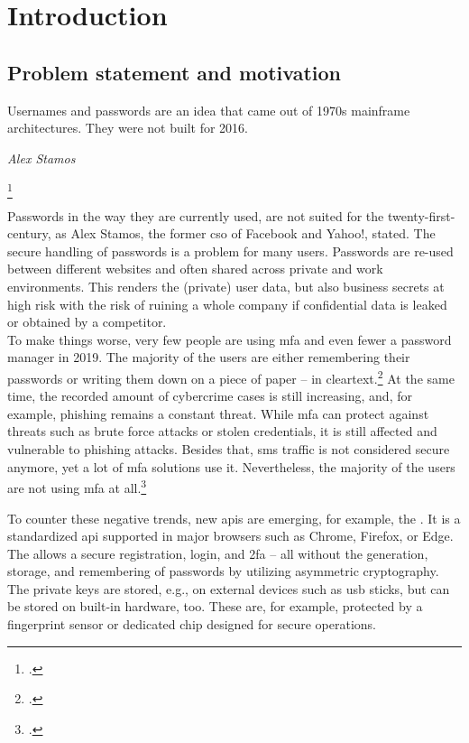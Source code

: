 \chapter{Introduction}
\label{chapter:introduction}

\section{Problem statement and motivation}

\setlength{}
\epigraph{\frqq Usernames and passwords are an idea that came out of 1970s mainframe architectures. They were not built for 2016.\flqq\footnotemark}{\textit{Alex Stamos}}
\footcitetext[See][]{stamos}

Passwords in the way they are currently used, are not suited for the twenty-first-century, as Alex Stamos, the former \gls{cso} of Facebook and Yahoo!, stated. The secure handling of passwords is a problem for many users. Passwords are re-used between different websites and often shared across private and work environments. This renders the (private) user data, but also business secrets at high risk with the risk of ruining a whole company if confidential data is leaked or obtained by a competitor.\\
To make things worse, very few people are using \gls{mfa} and even fewer a password manager in 2019. The majority of the users are either remembering their passwords or writing them down on a piece of paper -- in cleartext.\footcites[See][]{ibm-security}[See][]{web-de-passwords}
At the same time, the recorded amount of cybercrime cases is still increasing, and, for example, phishing remains a constant threat. While \gls{mfa} can protect against threats such as brute force attacks or stolen credentials, it is still affected and vulnerable to phishing attacks. Besides that, \gls{sms} traffic is not considered secure anymore, yet a lot of \gls{mfa} solutions use it. Nevertheless, the majority of the users are not using \gls{mfa} at all.\footcites[See][]{infratest-dimap}[See][6--7]{bka-cybercrime}[See][58]{dotson2019practical}

To counter these negative trends, new \glspl{api} are emerging, for example, the \wa. It is a standardized \gls{api} supported in major browsers such as Chrome, Firefox, or Edge. The \wa{} allows a secure registration, login, and \gls{2fa} -- all without the generation, storage, and remembering of passwords by utilizing asymmetric cryptography. The private keys are stored, e.g., on external devices such as \gls{usb} sticks, but can be stored on built-in hardware, too. These are, for example, protected by a fingerprint sensor or dedicated chip designed for secure operations.

